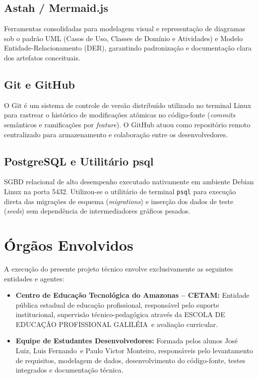 \documentclass[12pt,a4paper]{article}
\newcommand{\varEscola}{ESCOLA DE EDUCAÇÃO PROFISSIONAL GALILÉIA}
\newcommand{\varEstudanteUm}{José Luiz}
\newcommand{\varEstudanteDois}{Luis Fernando}
\newcommand{\varEstudanteTres}{Paulo Victor Monteiro}
\begin{document}
\subsection{Astah / Mermaid.js}

Ferramentas consolidadas para modelagem visual e representação de diagramas sob o padrão UML (Casos de Uso, Classes de Domínio e Atividades) e Modelo Entidade-Relacionamento (DER), garantindo padronização e documentação clara dos artefatos conceituais.

\subsection{Git e GitHub}

O Git é um sistema de controle de versão distribuído utilizado no terminal Linux para rastrear o histórico de modificações atômicas no código-fonte (\textit{commits} semânticos e ramificações por \textit{feature}). O GitHub atuou como repositório remoto centralizado para armazenamento e colaboração entre os desenvolvedores.

\subsection{PostgreSQL e Utilitário psql}

SGBD relacional de alto desempenho executado nativamente em ambiente Debian Linux na porta 5432. Utilizou-se o utilitário de terminal \texttt{psql} para execução direta das migrações de esquema (\textit{migrations}) e inserção dos dados de teste (\textit{seeds}) sem dependência de intermediadores gráficos pesados.

\newpage


\section{Órgãos Envolvidos}

A execução do presente projeto técnico envolve exclusivamente as seguintes entidades e agentes:

\begin{itemize}[leftmargin=1.5cm]

    \item \textbf{Centro de Educação Tecnológica do Amazonas -- CETAM:} Entidade pública estadual de educação profissional, responsável pelo suporte institucional, supervisão técnico-pedagógica através da \varEscola\ e avaliação curricular.

    \item \textbf{Equipe de Estudantes Desenvolvedores:} Formada pelos alunos \varEstudanteUm, \varEstudanteDois\ e \varEstudanteTres, responsáveis pelo levantamento de requisitos, modelagem de dados, desenvolvimento do código-fonte, testes integrados e documentação técnica.

\end{itemize}
\end{document}
